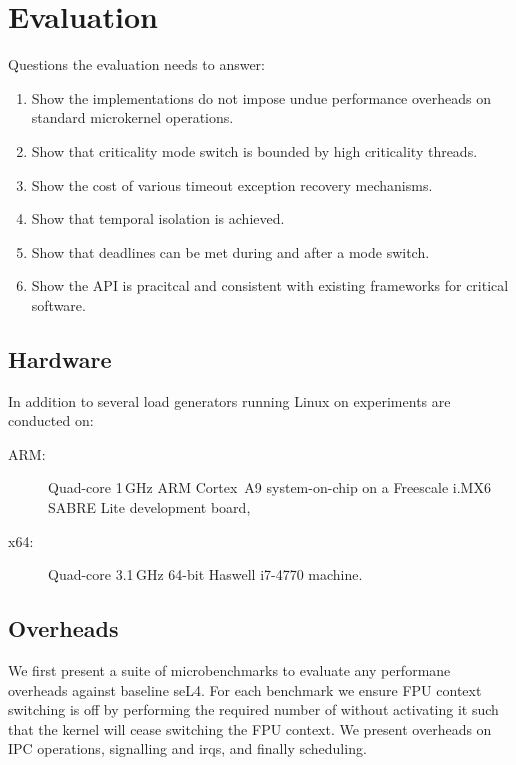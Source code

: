 \chapter{Evaluation}
\label{chap:evaluation}

Questions the evaluation needs to answer:

\begin{enumerate}
\item Show the implementations do not impose undue performance overheads on standard microkernel
operations.
\item Show that criticality mode switch is bounded by high criticality threads.
\item Show the cost of various timeout exception recovery mechanisms.
\item Show that temporal isolation is achieved.
\item Show that deadlines can be met during and after a mode switch.
\item Show the API is pracitcal and consistent with existing frameworks for critical software.
\end{enumerate}

\section{Hardware}

In addition to several load generators running Linux on experiments are conducted on:

\begin{description}
    \item[ARM:] Quad-core 1\,GHz ARM Cortex~A9 system-on-chip on a Freescale i.MX6 SABRE Lite development board,
    \item[x64:] Quad-core 3.1\,GHz 64-bit Haswell i7-4770 machine.
\end{description}

\section{Overheads}

We first present a suite of microbenchmarks to evaluate any performane overheads against baseline seL4.
For each benchmark we ensure \gls{FPU} context switching is off by performing the required number of
without activating it such that the kernel will cease switching the FPU context. We present
overheads on IPC operations, signalling and irqs, and finally scheduling. 

